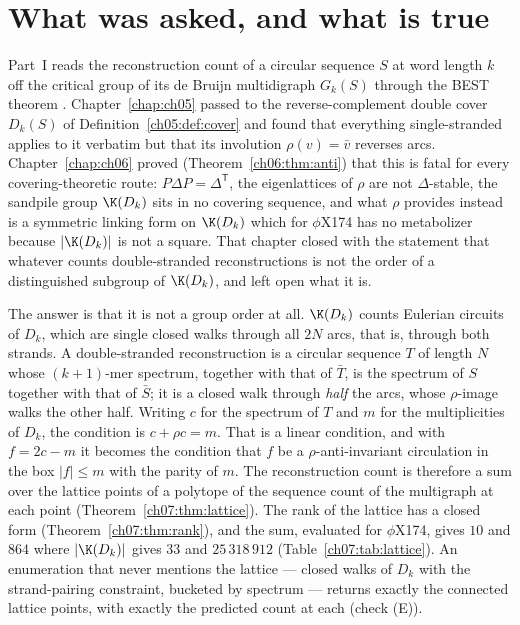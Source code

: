 \section{What was asked, and what is true}

Part~I reads the reconstruction count of a circular sequence $S$ at word length $k$ off the
critical group of its de Bruijn multidigraph $G_k(S)$ through the BEST theorem
\cite{BEST,SmithTutte}. Chapter~\ref{chap:ch05} passed to the reverse-complement double cover
$D_k(S)$ of Definition~\ref{ch05:def:cover} and found that everything single-stranded applies to
it verbatim but that its involution $\rho(v)=\bar v$ reverses arcs. Chapter~\ref{chap:ch06} proved
(Theorem~\ref{ch06:thm:anti}) that this is fatal for every covering-theoretic route: $P\Delta P=\Delta^{\mathsf T}$, the
eigenlattices of $\rho$ are not $\Delta$-stable, the sandpile group $\K(D_k)$ sits in no
covering sequence, and what $\rho$ provides instead is a symmetric linking form on $\K(D_k)$
which for $\phi$X174 has no metabolizer because $|\K(D_k)|$ is not a square. That chapter closed
with the statement that whatever counts double-stranded reconstructions is not the order of a
distinguished subgroup of $\K(D_k)$, and left open what it is.

The answer is that it is not a group order at all. $\K(D_k)$ counts Eulerian circuits of
$D_k$, which are single closed walks through all $2N$ arcs, that is, through both strands.
A double-stranded reconstruction is a circular sequence $T$ of length $N$ whose
$(k{+}1)$-mer spectrum, together with that of $\bar T$, is the spectrum of $S$ together with
that of $\bar S$; it is a closed walk through \emph{half} the arcs, whose $\rho$-image walks
the other half. Writing $c$ for the spectrum of $T$ and $m$ for the multiplicities of $D_k$,
the condition is $c+\rho c=m$. That is a linear condition, and with $f=2c-m$ it becomes the
condition that $f$ be a $\rho$-anti-invariant circulation in the box $|f|\le m$ with the parity
of $m$. The reconstruction count is therefore a sum over the lattice points of a polytope of
the sequence count of the multigraph at each point (Theorem~\ref{ch07:thm:lattice}). The rank of
the lattice has a closed form (Theorem~\ref{ch07:thm:rank}), and the sum, evaluated for $\phi$X174,
gives $10$ and $864$ where $|\K(D_k)|$ gives $33$ and $25\,318\,912$ (Table~\ref{ch07:tab:lattice}).
An enumeration that never mentions the lattice --- closed walks of $D_k$ with the
strand-pairing constraint, bucketed by spectrum --- returns exactly the connected lattice
points, with exactly the predicted count at each (check (E)).

